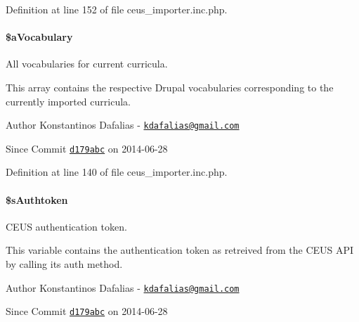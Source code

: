 Definition at line 152 of file ceus\+\_\+importer.\+inc.\+php.

\hypertarget{classceus__importer_a84266bdaf38a24150ceb43d88ebb230d}{
\paragraph[{\$a\+Vocabulary}]{\setlength{\rightskip}{0pt plus 5cm}\$a\+Vocabulary\hspace{0.3cm}{\ttfamily [private]}}}\label{classceus__importer_a84266bdaf38a24150ceb43d88ebb230d}


All vocabularies for current curricula. 

This array contains the respective Drupal vocabularies corresponding to the currently imported curricula.

\begin{DoxyAuthor}{Author}
Konstantinos Dafalias -\/ \href{mailto:kdafalias@gmail.com}{\tt kdafalias@gmail.\+com} 
\end{DoxyAuthor}
\begin{DoxySince}{Since}
Commit \href{http://github.com/TheJake123/DrupalModul/commit/d179abcc5e05743086cd67cf1ce30b08923a7183}{\tt d179abc} on 2014-\/06-\/28 
\end{DoxySince}


Definition at line 140 of file ceus\+\_\+importer.\+inc.\+php.

\hypertarget{classceus__importer_a0cd601a9ac27d96f9cdd6df63b16cdbf}{
\paragraph[{\$s\+Authtoken}]{\setlength{\rightskip}{0pt plus 5cm}\$s\+Authtoken\hspace{0.3cm}{\ttfamily [private]}}}\label{classceus__importer_a0cd601a9ac27d96f9cdd6df63b16cdbf}


C\+E\+U\+S authentication token. 

This variable contains the authentication token as retreived from the C\+E\+U\+S A\+P\+I by calling its {\ttfamily auth} method.

\begin{DoxyAuthor}{Author}
Konstantinos Dafalias -\/ \href{mailto:kdafalias@gmail.com}{\tt kdafalias@gmail.\+com} 
\end{DoxyAuthor}
\begin{DoxySince}{Since}
Commit \href{http://github.com/TheJake123/DrupalModul/commit/d179abcc5e05743086cd67cf1ce30b08923a7183}{\tt d179abc} on 2014-\/06-\/28 
\end{DoxySince}


